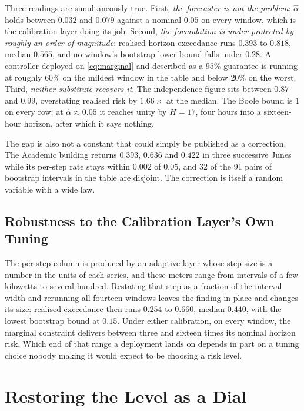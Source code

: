 \documentclass[conference]{IEEEtran}
\begin{document}
Three readings are simultaneously true. First, \emph{the forecaster is not the
problem}: $\hat\alpha$ holds between $0.032$ and $0.079$ against a nominal
$0.05$ on every window, which is the calibration layer doing its job. Second,
\emph{the formulation is under-protected by roughly an order of magnitude}:
realised horizon exceedance runs $0.393$ to $0.818$, median $0.565$, and no
window's bootstrap lower bound falls under $0.28$. A controller deployed on
\eqref{eq:marginal} and described as a $95\%$ guarantee is running at roughly
$60\%$ on the mildest window in the table and below $20\%$ on the worst. Third,
\emph{neither substitute recovers it}. The independence figure sits between
$0.87$ and $0.99$, overstating realised risk by $1.66\times$ at the median. The
Boole bound is $1$ on every row: at $\hat\alpha\approx0.05$ it reaches unity by
$H=17$, four hours into a sixteen-hour horizon, after which it says nothing.

The gap is also not a constant that could simply be published as a correction.
The Academic building returns $0.393$, $0.636$ and $0.422$ in three successive
Junes while its per-step rate stays within $0.002$ of $0.05$, and 32 of the 91
pairs of bootstrap intervals in the table are disjoint. The correction is
itself a random variable with a wide law.

\subsection{Robustness to the Calibration Layer's Own Tuning}

The per-step column is produced by an adaptive layer whose step size is a
number in the units of each series, and these meters range from intervals of a
few kilowatts to several hundred. Restating that step as a fraction of the
interval width and rerunning all fourteen windows leaves the finding in place
and changes its size: realised exceedance then runs $0.254$ to $0.660$, median
$0.440$, with the lowest bootstrap bound at $0.15$. Under either calibration,
on every window, the marginal constraint delivers between three and sixteen
times its nominal horizon risk. Which end of that range a deployment lands on
depends in part on a tuning choice nobody making it would expect to be choosing
a risk level.

\section{Restoring the Level as a Dial}
\label{sec:dial}
\end{document}
